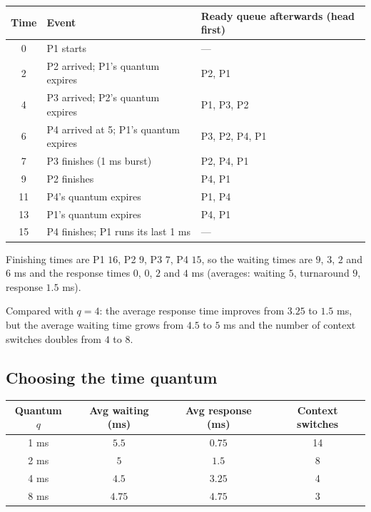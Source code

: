 \documentclass[11pt,a4paper]{article}
\begin{document}
\begin{center}
\renewcommand{\arraystretch}{1.15}
\begin{tabular}{@{}cll@{}}
\toprule
\textbf{Time} & \textbf{Event} & \textbf{Ready queue afterwards (head first)}\\
\midrule
0 & P1 starts & --- \\
2 & P2 arrived; P1's quantum expires & P2, P1 \\
4 & P3 arrived; P2's quantum expires & P1, P3, P2 \\
6 & P4 arrived at 5; P1's quantum expires & P3, P2, P4, P1 \\
7 & P3 finishes (1 ms burst) & P2, P4, P1 \\
9 & P2 finishes & P4, P1 \\
11 & P4's quantum expires & P1, P4 \\
13 & P1's quantum expires & P4, P1 \\
15 & P4 finishes; P1 runs its last 1 ms & --- \\
\bottomrule
\end{tabular}
\end{center}

Finishing times are P1 $16$, P2 $9$, P3 $7$, P4 $15$, so the waiting times are $9$, $3$, $2$ and $6$ ms and the response times $0$, $0$, $2$ and $4$ ms (averages: waiting $5$, turnaround $9$, response $1.5$ ms).


Compared with $q=4$: the average response time improves from $3.25$ to $1.5$ ms, but the average waiting time grows from $4.5$ to $5$ ms and the number of context switches doubles from $4$ to $8$.

\subsection{Choosing the time quantum}

\begin{center}
\renewcommand{\arraystretch}{1.2}
\begin{tabular}{@{}cccc@{}}
\toprule
\textbf{Quantum $q$} & \textbf{Avg waiting (ms)} & \textbf{Avg response (ms)} & \textbf{Context switches}\\
\midrule
1 ms & $5.5$ & $0.75$ & 14\\
2 ms & $5$ & $1.5$ & 8\\
4 ms & $4.5$ & $3.25$ & 4\\
8 ms & $4.75$ & $4.75$ & 3\\
\bottomrule
\end{tabular}
\end{center}
\end{document}
